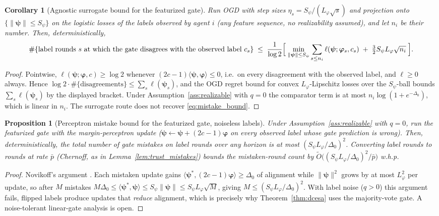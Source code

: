 \documentclass[11pt]{article}
\newtheorem{proposition}[theorem]{Proposition}
\newtheorem{corollary}[theorem]{Corollary}
\newcommand{\Ot}{\widetilde{O}}
\begin{document}
\begin{corollary}[Agnostic surrogate bound for the featurized gate]
\label{cor:agnostic}
Run OGD with step sizes $\eta_s=S_\psi/(L_\varphi\sqrt s)$ and
projection onto $\{\|\bm\psi\|\leq S_\psi\}$ on the logistic losses of
the labels observed by agent $i$ (any feature sequence, no
realizability assumed), and let $n_i$ be their number.  Then,
deterministically,
\[
\#\{\text{label rounds $s$ at which the gate disagrees with the
observed label } c_s\}
\;\leq\;
\frac{1}{\log 2}\Bigl[\;\min_{\|\bm\psi\|\leq S_\psi}
\sum_{s\leq n_i}\ell(\bm\psi;\bm\varphi_s,c_s)
\;+\;\tfrac32 S_\psi L_\varphi\sqrt{n_i}\;\Bigr].
\]
\end{corollary}

\begin{proof}
Pointwise, $\ell(\bm\psi;\bm\varphi,c)\geq\log 2$ whenever
$(2c-1)\langle\bm\psi,\bm\varphi\rangle\leq 0$, i.e.\ on every
disagreement with the observed label, and $\ell\geq 0$ always.  Hence
$\log 2\cdot\#\{\text{disagreements}\}\leq\sum_s\ell(\bm\psi_s)$, and
the OGD regret bound for convex $L_\varphi$-Lipschitz losses over the
$S_\psi$-ball \citep[Thm.~3.1]{hazan2016} bounds
$\sum_s\ell(\bm\psi_s)$ by the displayed bracket.  Under
Assumption~\ref{ass:realizable} with $q=0$ the comparator term is at
most $n_i\log(1+e^{-\Delta_0})$, which is linear in $n_i$. The
surrogate route does not recover \eqref{eq:mistake_bound}.
\end{proof}

\begin{proposition}[Perceptron mistake bound for the featurized gate,
noiseless labels]\label{prop:perceptron}
Under Assumption~\ref{ass:realizable} with $q=0$, run the featurized
gate with the margin-perceptron update
($\bm\psi\leftarrow\bm\psi+(2c-1)\bm\varphi$ on every observed
label whose gate prediction is wrong).  Then, deterministically, the
total number of gate mistakes on label rounds over any horizon is at
most $(S_\psi L_\varphi/\Delta_0)^2$. Converting label rounds to
rounds at rate $\bar p$ (Chernoff, as in
Lemma~\ref{lem:trust_mistakes}) bounds the mistaken-round count by
$\Ot\bigl((S_\psi L_\varphi/\Delta_0)^2/\bar p\bigr)$ w.h.p.
\end{proposition}

\begin{proof}
Novikoff's argument \citep{novikoff1962}. Each mistaken update gains
$\langle\bm\psi^{\!*},(2c-1)\bm\varphi\rangle\geq\Delta_0$ of
alignment while $\|\bm\psi\|^2$ grows by at most $L_\varphi^2$
per update, so after $M$ mistakes
$M\Delta_0\leq\langle\bm\psi^{\!*},\bm\psi\rangle\leq
S_\psi\|\bm\psi\|\leq S_\psi L_\varphi\sqrt M$, giving
$M\leq(S_\psi L_\varphi/\Delta_0)^2$.  With label noise ($q>0$)
this argument fails, flipped labels produce updates that
\emph{reduce} alignment, which is precisely why
Theorem~\ref{thm:dcesa} uses the majority-vote gate. A
noise-tolerant linear-gate analysis is open.
\end{proof}
\end{document}
